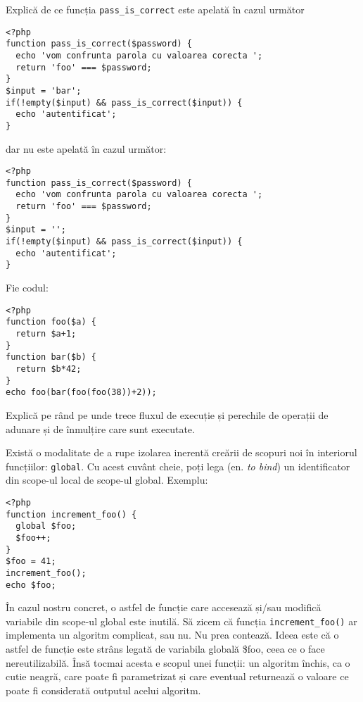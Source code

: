 \begin{Exercise}[title={Execuția liniară nu conține mereu toate verificările dintr-o condiție},difficulty=2]
Explică de ce funcția \texttt{pass\_is\_correct} este apelată
în cazul următor
\begin{lstlisting}
<?php
function pass_is_correct($password) {
  echo 'vom confrunta parola cu valoarea corecta ';
  return 'foo' === $password;
}
$input = 'bar';
if(!empty($input) && pass_is_correct($input)) {
  echo 'autentificat';
}
\end{lstlisting}
dar nu este apelată în cazul următor:
\begin{lstlisting}
<?php
function pass_is_correct($password) {
  echo 'vom confrunta parola cu valoarea corecta ';
  return 'foo' === $password;
}
$input = '';
if(!empty($input) && pass_is_correct($input)) {
  echo 'autentificat';
}
\end{lstlisting}
\end{Exercise}

\begin{Exercise}[title={Fluxul de execuție și apeluri nested la funcții},difficulty=1]
Fie codul:
\begin{lstlisting}
<?php
function foo($a) {
  return $a+1;
}
function bar($b) {
  return $b*42;
}
echo foo(bar(foo(foo(38))+2));
\end{lstlisting}
Explică pe rând pe unde trece fluxul de execuție și perechile de operații
de adunare și de înmulțire care sunt executate.
\end{Exercise}

Există o modalitate de a rupe izolarea inerentă creării de scopuri noi
în interiorul funcțiilor: \texttt{global}. Cu acest cuvânt cheie,
poți lega (en. \textsl{to bind}) un identificator din scope-ul local
de scope-ul global. Exemplu:
\begin{lstlisting}
<?php
function increment_foo() {
  global $foo;
  $foo++;
}
$foo = 41;
increment_foo();
echo $foo;
\end{lstlisting}

În cazul nostru concret, o astfel de funcție care accesează și/sau modifică
variabile din scope-ul global este inutilă. Să zicem că funcția
\texttt{increment\_foo()} ar implementa un algoritm complicat, sau nu. Nu
prea contează. Ideea este că o astfel de funcție este strâns legată
de variabila globală \$foo, ceea ce o face nereutilizabilă. Însă
tocmai acesta e scopul unei funcții: un algoritm închis,
ca o cutie neagră, care poate
fi parametrizat și care eventual returnează o valoare ce poate
fi considerată outputul acelui algoritm.

